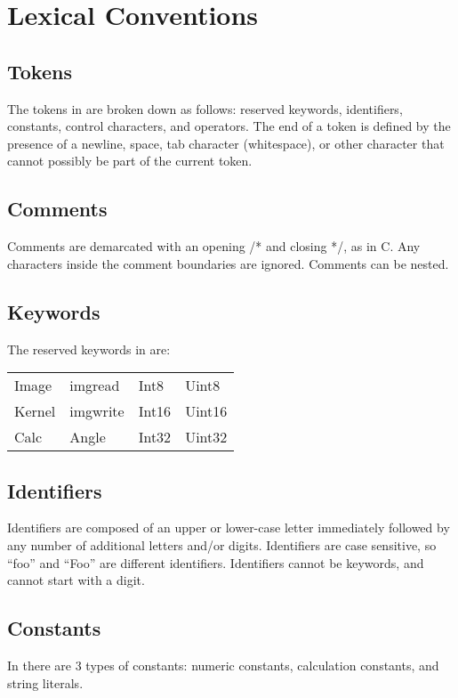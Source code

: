\section{Lexical Conventions}
\label{sec:lex}

\subsection{Tokens}
\label{ssec:tokens}
The tokens in \sys{} are broken down as follows: reserved
keywords, identifiers, constants, control characters, and operators.
The end of a token is defined by the presence of a newline, space,
tab character (whitespace), or other character that
cannot possibly be part of the current token.

\subsection{Comments}
\label{ssec:comments}
Comments are demarcated with an opening /* and closing */, as in C.
Any characters inside the comment boundaries are ignored. Comments
can be nested.

\clearpage %
\subsection{Keywords}
\label{ssec:keywords}
The reserved keywords in \sys{} are:
\begin{center}\begin{tabular}{l l l l}
Image & imgread & Int8 & Uint8\\
Kernel & imgwrite & Int16 & Uint16\\
Calc & Angle & Int32 & Uint32
\end{tabular}\end{center}

\subsection{Identifiers}
\label{ssec:identifiers}
Identifiers are composed of an upper or lower-case letter immediately
followed by any number of additional letters and/or digits. Identifiers
are case sensitive, so ``foo'' and ``Foo'' are different identifiers.
Identifiers cannot be keywords, and cannot start with a digit.

\subsection{Constants}
\label{ssec:constants}
In \sys{} there are 3 types of constants: numeric constants,
calculation constants, and string literals.

